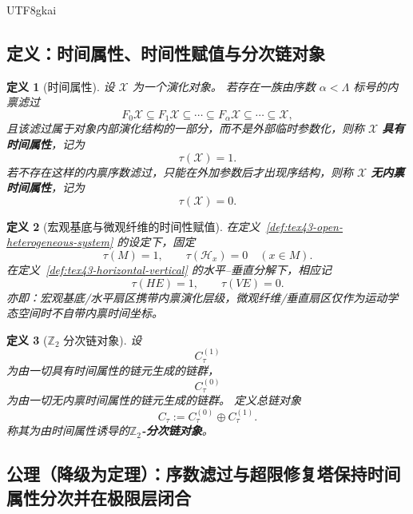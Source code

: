 \documentclass[12pt]{article}
\newtheorem{definition}{定义}[section]
\newcommand{\Ztwo}{\mathbb{Z}_2}
\begin{document}
\begin{CJK*}{UTF8}{gkai}
\subsection{定义：时间属性、时间性赋值与分次链对象}
\label{subsec:tex43-ch2-definitions}

\begin{definition}[时间属性]
\label{def:tex43-time-attribute}
设 $\mathcal X$ 为一个演化对象。
若存在一族由序数 $\alpha<\Lambda$ 标号的内禀滤过
\[
  F_0\mathcal X
  \subseteq
  F_1\mathcal X
  \subseteq
  \cdots
  \subseteq
  F_\alpha\mathcal X
  \subseteq
  \cdots
  \subseteq
  \mathcal X,
\]
且该滤过属于对象内部演化结构的一部分，而不是外部临时参数化，则称 $\mathcal X$ \textbf{具有时间属性}，记为
\[
  \tau(\mathcal X)=1.
\]
若不存在这样的内禀序数滤过，只能在外加参数后才出现序结构，则称 $\mathcal X$ \textbf{无内禀时间属性}，记为
\[
  \tau(\mathcal X)=0.
\]
\end{definition}

\begin{definition}[宏观基底与微观纤维的时间性赋值]
\label{def:tex43-time-assignment}
在定义~\ref{def:tex43-open-heterogeneous-system} 的设定下，固定
\[
  \tau(M)=1,
  \qquad
  \tau(\mathcal H_x)=0
  \quad (x\in M).
\]
在定义~\ref{def:tex43-horizontal-vertical} 的水平--垂直分解下，相应记
\[
  \tau(HE)=1,
  \qquad
  \tau(VE)=0.
\]
亦即：宏观基底/水平扇区携带内禀演化层级，微观纤维/垂直扇区仅作为运动学态空间时不自带内禀时间坐标。
\end{definition}

\begin{definition}[\texorpdfstring{$\Ztwo$}{Z2} 分次链对象]
\label{def:tex43-z2-graded-chain}
设
\[
  C_{\tau}^{(1)}
\]
为由一切具有时间属性的链元生成的链群，
\[
  C_{\tau}^{(0)}
\]
为由一切无内禀时间属性的链元生成的链群。
定义总链对象
\[
  C_{\tau}
  :=
  C_{\tau}^{(0)}
  \oplus
  C_{\tau}^{(1)}.
\]
称其为由时间属性诱导的\textbf{\(\Ztwo\)-分次链对象}。
\end{definition}

\subsection{公理（降级为定理）：序数滤过与超限修复塔保持时间属性分次并在极限层闭合}
\label{subsec:tex43-ch2-axiom-downgrade}


\end{CJK*}
\end{document}
